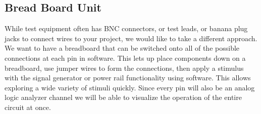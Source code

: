 \subsection{Bread Board Unit}
	While test equipment often has BNC connectors, or test leads, or banana plug jacks to connect wires to your project, we would like to take a different approach. We want to have a breadboard that can be switched onto all of the possible connections at each pin in software. This lets up place components down on a breadboard, use jumper wires to form the connections, then apply a stimulus with the signal generator or power rail functionality using software. This allows exploring a wide variety of stimuli quickly. Since every pin will also be an analog logic analyzer channel we will be able to visualize the operation of the entire circuit at once.
